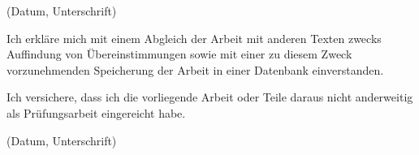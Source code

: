 \documentclass[a4paper,11pt,twoside]{scrreport}
\begin{document}
\vspace{1cm}


\vspace{-1cm}

(Datum, Unterschrift)

\vspace{1cm}

Ich erkläre mich mit einem Abgleich der Arbeit mit anderen Texten zwecks Auffindung von 
Übereinstimmungen sowie mit einer zu diesem Zweck vorzunehmenden Speicherung der Arbeit in einer 
Datenbank einverstanden.

Ich versichere, dass ich die vorliegende Arbeit oder Teile daraus nicht anderweitig als 
Prüfungsarbeit eingereicht habe.

\vspace{1cm}


\vspace{-1cm}

(Datum, Unterschrift)

\makeheaderempty

\eject
\end{document}
